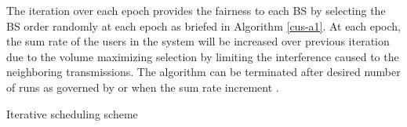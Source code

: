 The iteration over each epoch provides the fairness to each \ac{BS} by selecting the \ac{BS} order randomly at each epoch as briefed in Algorithm \ref{cus-a1}. At each epoch, the sum rate of the users in the system will be increased over previous iteration due to the volume maximizing selection by limiting the interference caused to the neighboring transmissions. The algorithm can be terminated after desired number of runs as governed by  or when the sum rate increment .
\begin{algorithm}
 \SetAlgoLined
 \DontPrintSemicolon
 \caption{Iterative scheduling scheme}
 \label{cus-a1}
\end{algorithm}
